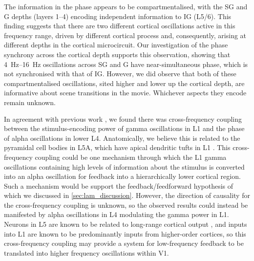 The information in the phase appears to be compartmentalised, with the \ac{SG} and \ac{G} depths (layers 1--4) encoding independent information to \ac{IG} (\acl{L5/6}).
This finding suggests that there are two different cortical oscillations active in this frequency range, driven by different cortical process and, consequently, arising at different depths in the cortical microcircuit.
Our investigation of the phase synchrony across the cortical depth supports this observation, showing that \SIrange{4}{16}{Hz} oscillations across \ac{SG} and \ac{G} have near-simultaneous phase, which is not synchronised with that of \ac{IG}.
However, we did observe that both of these compartmentalised oscillations, sited higher and lower up the cortical depth, are informative about scene transitions in the movie.
Whichever aspects they encode remain unknown.

In agreement with previous work \citep{Spaak2012}, we found there was cross-frequency coupling between the stimulus-encoding power of gamma oscillations in \acs{L1} and the phase of alpha oscillations in lower \acs{L4}.
Anatomically, we believe this is related to the pyramidal cell bodies in \acs{L5A}, which have apical dendritic tufts in \acs{L1} \citep{Hill2013,Zhu2004}.
This cross-frequency coupling could be one mechanism through which the \acs{L1} gamma oscillations containing high levels of information about the stimulus is converted into an alpha oscillation for feedback into a hierarchically lower cortical region.
Such a mechanism would be support the feedback/feedforward hypothesis of \citet{VanKerkoerle2014} which we discussed in \autoref{sec:lam_discussion}.
However, the direction of causality for the cross-frequency coupling is unknown, so the observed results could instead be manifested by alpha oscillations in \acs{L4} modulating the gamma power in \acs{L1}.
Neurons in \acs{L5} are known to be related to long-range cortical output \citep{Hill2013}, and inputs into \acs{L1} are known to be predominantly inputs from higher-order cortices, so this cross-frequency coupling may provide a system for low-frequency feedback to be translated into higher frequency oscillations within \ac{V1}.
